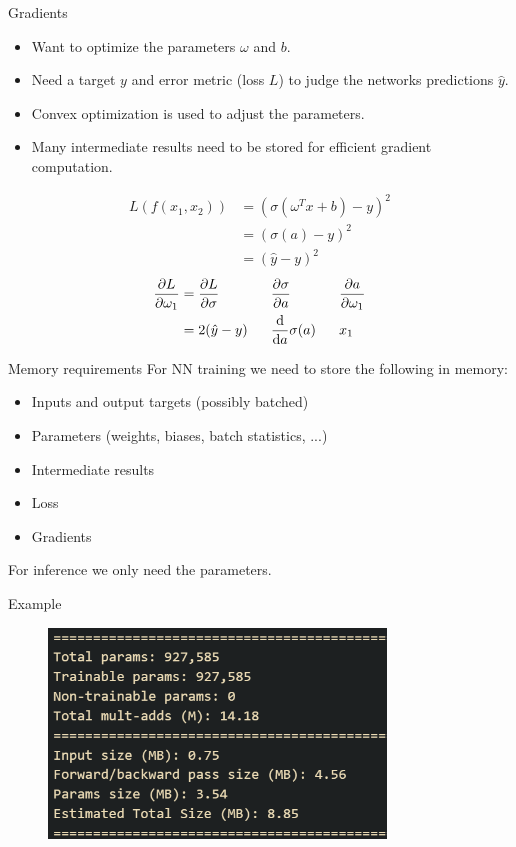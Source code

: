 \documentclass[aspectratio=169]{beamer} %
\begin{document}
\begin{frame}{Gradients}
  \begin{itemize}
    \item Want to optimize the parameters $\omega$ and $b$.
    \item Need a target $y$ and error metric (loss $L$) to judge the networks predictions $\hat y$.
    \item Convex optimization is used to adjust the parameters.
    \item Many intermediate results need to be stored for efficient gradient computation.
  \end{itemize}

  \begin{align*}
    L(f(x_1, x_2)) &= (\sigma(\omega^T x + b) - y) ^2\\
                   &= (\sigma(a) - y) ^ 2\\
                   &= (\hat y - y) ^ 2
  \end{align*}
  \begin{alignat*}{3}
    \pdv{L}{\omega_1} &= \pdv{L}{\sigma} &&\pdv{\sigma}{a}      &&\pdv{a}{\omega_1}\\
                      &= 2(\hat y - y)~~ &&\odv{}{a}\sigma(a)~~ &&x_1
  \end{alignat*}
  
\end{frame}

\begin{frame}{Memory requirements}
  For NN training we need to store the following in memory:
  \begin{itemize}
    \item Inputs and output targets (possibly batched)
    \item Parameters (weights, biases, batch statistics, ...)
    \item Intermediate results
    \item Loss
    \item Gradients
  \end{itemize}

  For inference we only need the parameters.
  
\end{frame}

\begin{frame}{Example}
  \begin{figure}
    \includegraphics[width=0.8\textwidth]{figures/mobilenet-size.png}
  \end{figure}
\end{frame}
\end{document}
